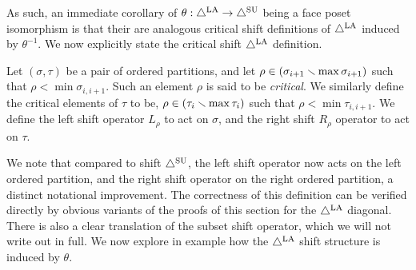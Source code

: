As such, an immediate corollary of $\theta:\triangle^{\mathrm{LA}} \to \triangle^{\mathrm{SU}}$ being a face poset isomorphism is that their are analogous critical shift definitions of $\triangle^{\mathrm{LA}}$ induced by $\theta^{-1}$. 
We now explicitly state the critical shift $\triangle^{\mathrm{LA}}$ definition.
\begin{definition} \label{def:critical LA shift}
Let $(\sigma,\tau)$ be a pair of ordered partitions, and let $\rho \in (\sigma_{i+1} \smallsetminus \max \sigma_{i+1})$ such that $\rho< \min \sigma_{i,i+1}$. Such an element $\rho$ is said to be \emph{critical}. 
We similarly define the critical elements of $\tau$ to be, $\rho \in (\tau_{i} \smallsetminus \max\tau_{i})$ such that $\rho < \min \tau_{i,i+1}$. 
We define the left shift operator $L_{\rho}$ to act on $\sigma$, and the right shift $R_{\rho}$ operator to act on $\tau$.
\end{definition}
We note that compared to shift $\triangle^{\mathrm{SU}}$, the left shift operator now acts on the left ordered partition, and the right shift operator on the right ordered partition, a distinct notational improvement.
The correctness of this definition can be verified directly by obvious variants of the proofs of this section for the $\triangle^{\mathrm{LA}}$ diagonal.
There is also a clear translation of the subset shift operator, which we will not write out in full. 
We now explore in example how the $\triangle^{\mathrm{LA}}$ shift structure is induced by $\theta$.

